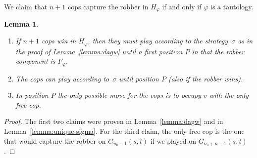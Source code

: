 \documentclass[authoryear]{article}
\newtheorem{lemma}[theorem]{Lemma}
\theoremstyle{definition}
\renewcommand{\phi}{\varphi}
\newcommand{\0}{\emptyset}
\begin{document}
We claim that $n+1$ cops capture the robber in $H_\phi$ if and only if
$\phi$ is a tautology. 
\begin{lemma}\label{lemma:in-F-phi}
  \begin{enumerate}
  \item If $n+1$ cops win in $H_\phi$, then they must play according
    to the strategy~$\sigma$ as in the proof of Lemma~\ref{lemma:dagw} until
    a first position $P$ in that the robber component is $F_\phi$.
  \item The cops can play according to~$\sigma$ until position $P$
    (also if the robber wins).
  \item In position $P$ the only possible move for the cops is to occupy $v$
with the only free cop.
  \end{enumerate}
\end{lemma}
\begin{proof}
  The first two claims were proven in Lemma~\ref{lemma:dagw} and in
  Lemma~\ref{lemma:unique-sigma}. For the third claim, the only free
  cop is the one that would capture the robber on
$G_{n_0-1}(s,t)$ if we played on $G_{n_0+n-1}(s,t)$.
\end{proof}
\end{document}
